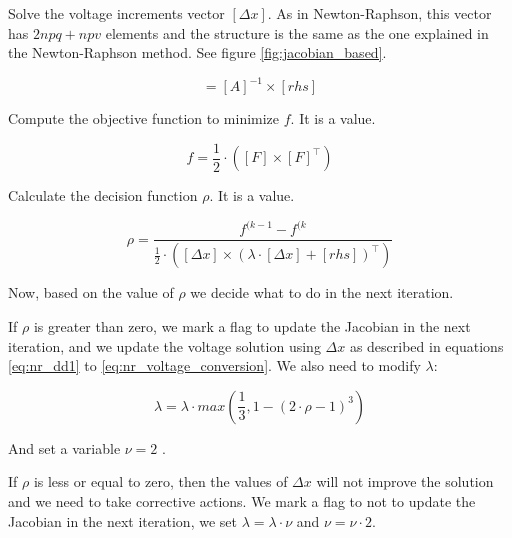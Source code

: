 \documentclass[nols,a4paper,twoside,notoc,fleqn]{tufte-book}
\begin{document}
Solve the voltage increments vector $[\Delta x]$. As in Newton-Raphson, this vector has $2npq+npv$ elements and the structure is the same as the one explained in the Newton-Raphson method. See figure \ref{fig:jacobian_based}.


\begin{equation}
[\Delta x] = [A]^{-1} \times [rhs]
\label{eq:lm_solve}
\end{equation}


Compute the objective function to minimize $f$. It is a value.

\begin{equation}
f = \frac{1}{2} \cdot \left([F] \times [F]^\top \right)
\label{eq:lm_f}
\end{equation}

Calculate the decision function $\rho$. It is a value.


\begin{equation}
\rho = \frac{f^{(k-1}-f^{(k}}{\frac{1}{2} \cdot \left([\Delta x] \times (\lambda \cdot [\Delta x] + [rhs])^\top \right)}
\label{eq:lm_rho}
\end{equation}

Now, based on the value of $\rho$ we decide what to do in the next iteration.

If $\rho$ is greater than zero, we mark a flag to update the Jacobian in the next iteration, and we update the voltage solution using $\Delta x$ as described in equations  \ref{eq:nr_dd1} to \ref{eq:nr_voltage_conversion}. We also need to modify $\lambda$:


\begin{equation}
\lambda = \lambda \cdot max \left( \frac{1}{3}, 1-(2\cdot \rho -1)^3 \right)
\label{eq:lm_update_l}
\end{equation}

And set a variable $\nu=2$ .


If $\rho$ is less or equal to zero, then the values of $\Delta x$ will not improve the solution and we need to take corrective actions. We mark a flag to not to update the Jacobian in the next iteration, we set $\lambda=\lambda \cdot \nu$ and $\nu = \nu \cdot 2$.
\end{document}
